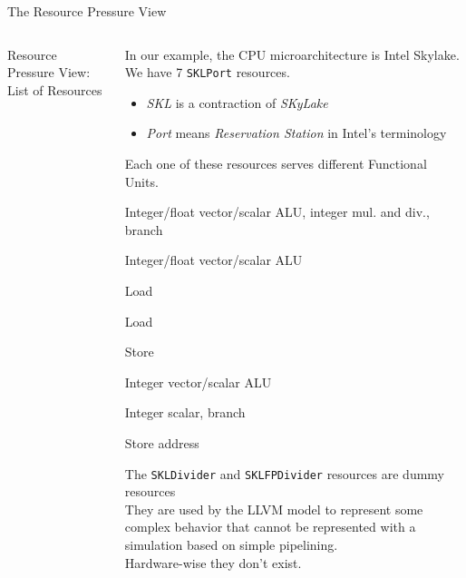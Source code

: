 \begin{frame}{The Resource Pressure View}

\begin{columns}

\begin{block}{Resource Pressure View: List of Resources}
\end{block}


\begin{overprint}
\raggedright\bigskip
In our example, the CPU microarchitecture is \alert{Intel Skylake}.\\
We have \alert{7 \texttt{SKLPort} resources}.
\begin{itemize}
\item \emph{SKL} is a contraction of \emph{SKyLake}
\item \emph{Port} means \emph{Reservation Station} in Intel's terminology
\end{itemize}
Each one of these resources serves different Functional Units.
\vfill
%
\begin{description}
\item[\texttt{SKLPort0}] Integer/float vector/scalar ALU, integer mul. and div., branch
\item[\texttt{SKLPort1}] Integer/float vector/scalar ALU
\item[\texttt{SKLPort2}] Load
\item[\texttt{SKLPort3}] Load
\item[\texttt{SKLPort4}] Store
\item[\texttt{SKLPort5}] Integer vector/scalar ALU
\item[\texttt{SKLPort6}] Integer scalar, branch
\item[\texttt{SKLPort7}] Store address
\end{description}
%
\raggedright\bigskip
The \texttt{SKLDivider} and \texttt{SKLFPDivider} resources are 
\alert{dummy resources}\\
\bigskip
They are used by the LLVM model to represent some complex
behavior that cannot be represented with a simulation based on simple pipelining.\\
\bigskip
Hardware-wise they don't exist.
\end{overprint}

\end{columns}

\end{frame}


